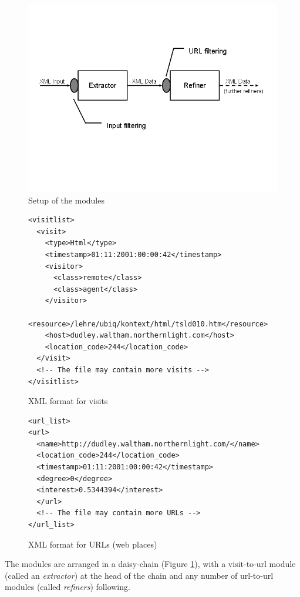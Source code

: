 \documentclass[a4paper,twoside]{danarticle}
\theoremstyle{remark}
\begin{document}
      \begin{figure}[ht]
        \centering
        \includegraphics[width=12cm]{gilbert_steps}
        \caption{Setup of the modules}
        \label{gilbert_steps}
      \end{figure}
      \begin{figure}[ht]
\begin{verbatim}
<visitlist>
  <visit>
    <type>Html</type>
    <timestamp>01:11:2001:00:00:42</timestamp>
    <visitor>
      <class>remote</class>
      <class>agent</class>
    </visitor>
    <resource>/lehre/ubiq/kontext/html/tsld010.htm</resource>
    <host>dudley.waltham.northernlight.com</host>
    <location_code>244</location_code>
  </visit>
  <!-- The file may contain more visits -->
</visitlist>
\end{verbatim}
        \caption{XML format for visits}
	\label{visitxml}
      \end{figure}
      \begin{figure}[ht]
\begin{verbatim}
<url_list>
<url>
  <name>http://dudley.waltham.northernlight.com/</name>
  <location_code>244</location_code>
  <timestamp>01:11:2001:00:00:42</timestamp>
  <degree>0</degree>
  <interest>0.5344394</interest>
  </url>
  <!-- The file may contain more URLs -->
</url_list>
\end{verbatim}
        \caption{XML format for URLs (web places)}
	\label{urlxml}
      \end{figure}
      
      The modules are arranged in a daisy-chain (Figure \ref{gilbert_steps}), 
      with a visit-to-url module 
      (called an \textit{extractor}) at the head of the chain and any number of 
      url-to-url modules (called \textit{refiners}) following. 
      
\end{document}
